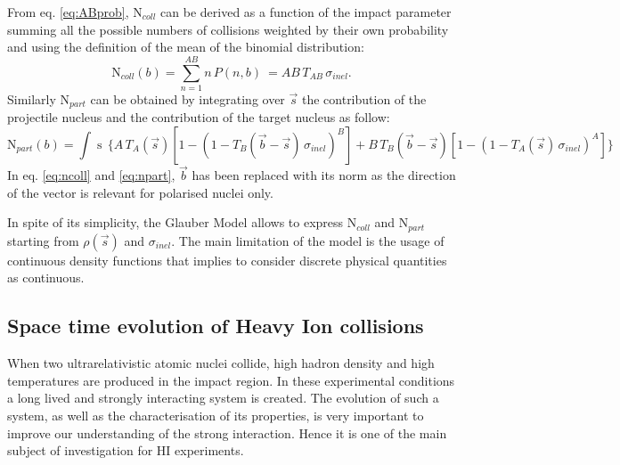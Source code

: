 From eq. \ref{eq:ABprob}, $\mathrm{N}_{coll}$ can be derived as a function of the impact parameter 
summing all the possible numbers of collisions weighted by their own probability and using the
definition of the mean of the binomial distribution:
\begin{equation} \label{eq:ncoll}
    \mathrm{N}_{coll}(b) = \sum_{n=1}^{AB} n\, P(n,b) \ = AB\, T_{AB}\, \sigma_{inel}.
\end{equation}
Similarly $\mathrm{N}_{part}$ can be obtained by integrating over $\vec{s}$ the contribution of the
projectile nucleus and the contribution of the target nucleus as follow:
\begin{equation} \label{eq:npart}
    \mathrm{N}_{part}(b) = \int \mathop{d^{2}s} \, \bigl\{ A\, T_{A}(\vec{s})[1-(1- T_{B}(\vec{b}-\vec{s})\, \sigma_{inel})^{B}
    ] + B\, T_{B}(\vec{b}-\vec{s}) [1-(1-T_{A}(\vec{s})\,\sigma_{inel})^{A}] \bigr\}
\end{equation}
In eq. \ref{eq:ncoll} and \ref{eq:npart}, $\vec{b}$ has been replaced with its norm as the direction 
of the vector is relevant for polarised nuclei only.

In spite of its simplicity, the Glauber Model allows to express $\mathrm{N}_{coll}$ and 
$\mathrm{N}_{part}$ starting from $\rho(\vec{s})$ and $\sigma_{inel}$. The main limitation of the model is the usage of continuous density functions that implies to consider discrete physical quantities 
as continuous.

%
\subsection{Space time evolution of Heavy Ion collisions} \label{sec:1.3.2}

When two ultrarelativistic atomic nuclei collide, high hadron density and high temperatures
are produced in the impact region. 
In these experimental conditions a long lived and strongly interacting system is created.
The evolution of such a system, as well as the characterisation of its properties, is very important
to improve our understanding of the strong interaction. Hence it is one of the main subject of 
investigation for HI experiments.

